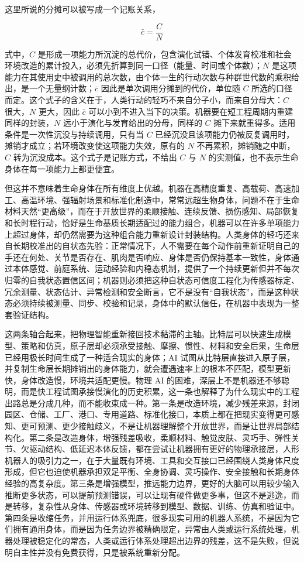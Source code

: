 这里所说的分摊可以被写成一个记账关系，

\begin{equation}
\bar{c}=\frac{C}{N}
\end{equation}

式中，$C$ 是形成一项能力所沉淀的总代价，包含演化试错、个体发育校准和社会环境改造的累计投入，必须先折算到同一口径（能量、时间或个体数）；$N$ 是这项能力在其使用史中被调用的总次数，由个体一生的行动次数与种群世代数的乘积给出，是一个无量纲计数；$\bar{c}$ 因此是单次调用分摊到的代价，单位随 $C$ 所选的口径而定。这个式子的含义在于，人类行动的轻巧不来自分子小，而来自分母大：$C$ 很大，$N$ 更大，因此 $\bar{c}$ 可以小到不进入当下的决策。机器要在短工程周期内重建同样的封装，$N$ 远小于演化与发育给出的分母，同样的 $C$ 摊下来就重得多。适用条件是一次性沉没与持续调用，只有当 $C$ 已经沉没且该项能力仍被反复调用时，摊销才成立；若环境改变使这项能力失效，原有的 $N$ 不再累积，摊销随之中断，$C$ 转为沉没成本。这个式子是记账方式，不给出 $C$ 与 $N$ 的实测值，也不表示生命身体在每一项能力上都更便宜。

但这并不意味着生命身体在所有维度上优越。机器在高精度重复、高载荷、高速加工、高温环境、强辐射场景和标准化制造中，常常远超生物身体，问题不在于生命材料天然“更高级”，而在于开放世界的柔顺接触、连续反馈、损伤感知、局部恢复和长时程行动，恰好是生命基质长期适配过的能力组合，机器可以在许多单项能力上超过身体，却仍然需要为这种组合能力重新设计封装结构。人类身体的轻巧还来自长期校准出的自状态先验：正常情况下，人不需要在每个动作前重新证明自己的手还在何处、关节是否存在、肌肉是否响应、身体是否仍保持基本一致性，身体通过本体感觉、前庭系统、运动经验和内稳态机制，提供了一个持续更新但并不每次归零的自我状态置信区间；机器则必须把这种自状态可信度工程化为传感器标定、冗余测量、状态估计、异常检测和安全断言，它不是没有“自我状态”，而是这种状态必须持续被测量、同步、校验和记录，身体中的默认信任，在机器中表现为一整套验证结构。

这两条轴合起来，把物理智能重新接回技术黏滞的主轴。比特层可以快速生成模型、策略和仿真，原子层却必须承受接触、摩擦、惯性、材料和安全后果，生命层已经用极长时间生成了一种适合现实的身体；AI 试图从比特层直接进入原子层，并复制生命层长期摊销出的身体能力，就会遭遇速率上的根本不匹配，模型更新快，身体改造慢，环境共适配更慢。物理 AI 的困难，深层上不是机器还不够聪明，而是快工程试图承接慢演化的历史积累，这一条也解释了为什么现实中的工程出路总是分成几种，而不能收束成一种。第一条是改造环境，减少残差来源，封闭园区、仓储、工厂、港口、专用道路、标准化接口，本质上都在把现实变得更可感知、更可预测、更少接触歧义，不是让机器理解整个开放世界，而是让世界局部结构化。第二条是改造身体，增强残差吸收，柔顺材料、触觉皮肤、灵巧手、弹性关节、欠驱动结构、低延迟本体反馈，都在尝试让机器拥有更好的物理承接层，人形机器人的吸引力之一，在于大量既有环境、工具和交互接口已经围绕人类身体尺度形成，但它也迫使机器承担双足平衡、全身协调、灵巧操作、安全接触和长期身体经验的高复杂度。第三条是增强模型，推远能力边界，更好的大脑可以用较少输入推断更多状态，可以提前预测错误，可以让现有硬件做更多事，但这不是逃逸，而是转移，复杂性从身体、传感器或环境转移到模型、数据、训练、仿真和验证中。第四条是收缩任务，并用运行体系兜底，很多现实可用的机器人系统，不是因为它们拥有通用身体，而是因为任务边界被精确限定，异常由人类或运行系统处理，机器处理被稳定化的常态，人类或运行体系处理超出边界的残差，这不是失败，但说明自主性并没有免费获得，只是被系统重新分配。

